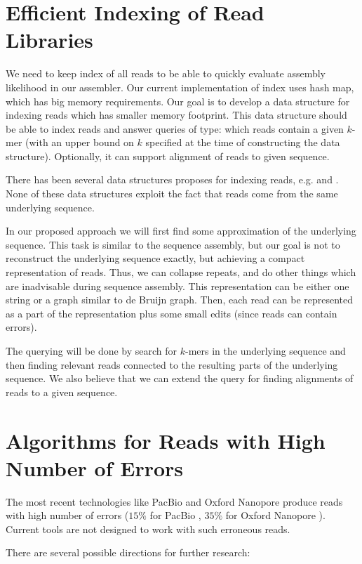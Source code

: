 \section{Efficient Indexing of Read Libraries}

We need to keep index of all reads to be
able to quickly evaluate assembly likelihood in our assembler.
Our current implementation of index uses hash map, which
has big memory requirements.
Our goal is to develop a data structure for indexing
reads which has smaller memory footprint.
This data structure should be able to index reads
and answer queries of type: which reads contain
a given $k$-mer (with an upper bound on $k$ specified at the time
of constructing the data structure). Optionally,
it can support alignment of reads to given sequence.

There has been several data structures proposes for
indexing reads, e.g. \cite{GKArrays} and \cite{CGKArrays}.
None of these data structures exploit the fact
that reads come from the same underlying sequence.

In our proposed approach we will
first find some approximation of the underlying sequence.
This task is similar to the sequence assembly, but our goal
is not to reconstruct the underlying sequence exactly, but achieving a compact
representation of reads. Thus, we can collapse repeats, and do other things
which are inadvisable during sequence assembly.
This representation can be either one string or a graph similar to
de Bruijn graph. Then, each read can be represented
as a part of the representation plus some small edits (since
reads can contain errors).

The querying will be done by search for $k$-mers in the underlying
sequence and then finding relevant reads connected to the resulting
parts of the underlying sequence. We also believe
that we can extend the query for finding alignments of reads to a given sequence.

\section{Algorithms for Reads with High Number of Errors}

The most recent technologies like PacBio \citep{PacbioToCA} and Oxford
Nanopore \citep{oxford} produce reads with high number of errors
($15\%$ for PacBio \citep{PacbioToCA}, $35\%$ for Oxford Nanopore \citep{oxford}).
Current tools are not designed to work with such erroneous reads.

There are several possible directions for further research:

